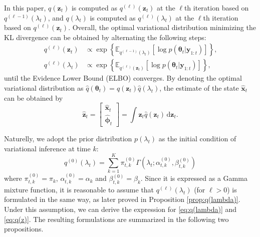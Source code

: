 \documentclass[10pt,twocolumn,twoside]{IEEEtran}
\newcommand{\e}[1]{\exp\left\{#1\right\}}
\newcommand{\E}[2][]{ \mathbb{E}_{#1}\left[#2\right] } %
\newcommand{\cm}{\text{,}} %
\newcommand{\fs}{\text{.}} %
\newcommand{\x}{{ \bm{x} }}
\newcommand{\y}{{ \bm{y} }}
\newcommand{\z}{{ \bm{z} }}
\begin{document}
In this paper, $q(\z_t)$ is computed as $q^{(\ell)}(\z_t)$ at the $\ell$th iteration based on $q^{(\ell-1)}(\lambda_t)$, and $q(\lambda_t)$ is computed as $q^{(\ell)}(\lambda_t)$ at the $\ell$th iteration based on $q^{(\ell)}(\z_t)$. Overall, the optimal variational distribution minimizing the KL divergence can be obtained by alternating the following steps:
\begin{align}
    q^{(\ell)}(\z_t) &\propto \e{\E[q^{(\ell-1)}(\lambda_t)]{\log{p(\bm\theta_t|\y_{1:t})}}}\cm \label{eq:q(z)} \\
    q^{(\ell)}(\lambda_t) &\propto \e{\E[q^{(\ell)}(\z_t)]{\log{p(\bm\theta_t|\y_{1:t})}}}\cm \label{eq:q(lambda)}
\end{align}
until the Evidence Lower Bound (ELBO) converges\cite{blei2017variational}. By denoting the optimal variational distribution as $\hat{q}(\bm\theta_t)=\hat{q}(\bm\z_t)\hat{q}(\lambda_t)$, the estimate of the state $\hat\x_t$ can be obtained by
$$ %
\hat\z_t = \begin{bmatrix}
    \hat\x_t\\
    \hat{\bm\phi}_t
\end{bmatrix} = \int{\z_t\hat{q}(\z_t)}\,\mathrm{d}\z_t \fs
$$


Naturelly, we adopt the prior distribution $p(\lambda_t)$ as the initial condition of variational inference at time $k$:
$$
q^{(0)}(\lambda_t) = \sum_{k=1}^K\pi_{t,k}^{(0)}\Gamma(\lambda_t;\alpha_{t,k}^{(0)},\beta_{t,k}^{(0)})
$$
where $\pi_{t,k}^{(0)}=\pi_k$, $\alpha_{t,k}^{(0)}=\alpha_k$ and $\beta_{t,k}^{(0)}=\beta_k$. Since it is expressed as a Gamma mixture function, it is reasonable to assume that $q^{(\ell)}(\lambda_t)$ (for $\ell>0$) is formulated in the same way, as later proved in Proposition \ref{prop:q(lambda)}. Under this assumption, we can derive the expression for \eqref{eq:q(lambda)} and \eqref{eq:q(z)}. The resulting formulations are summarized in the following two propositions.
\end{document}
